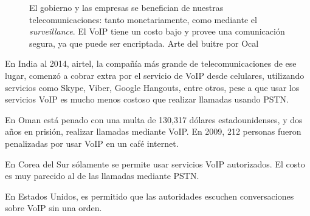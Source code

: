 \begin{figure}
\centering
{}
\caption{El gobierno y las empresas se benefician de nuestras telecomunicaciones: tanto monetariamente, como mediante el \textit{surveillance}. El VoIP tiene un costo bajo y provee una comunicación segura, ya que puede ser encriptada. Arte del buitre por Ocal\cite{clker:ocal}}
\end{figure}

\cite{rip:manifesto}

En India al 2014, airtel, la compañía más grande de telecomunicaciones de ese lugar, comenzó a cobrar extra por el servicio de VoIP desde celulares, utilizando servicios como Skype, Viber, Google Hangouts, entre otros, pese a que usar los servicios VoIP es mucho menos costoso que realizar llamadas usando PSTN.\cite{airtel}

En Oman está penado con una multa de 130,317 dólares estadounidenses, y dos años en prisión, realizar llamadas mediante VoIP. En 2009, 212 personas fueron penalizadas por usar VoIP en un café internet.\cite{oman}

En Corea del Sur sólamente se permite usar servicios VoIP autorizados. El costo es muy parecido al de las llamadas mediante PSTN.\cite{korea}

En Estados Unidos, es permitido que las autoridades escuchen conversaciones sobre VoIP sin una orden.\cite{usa}

